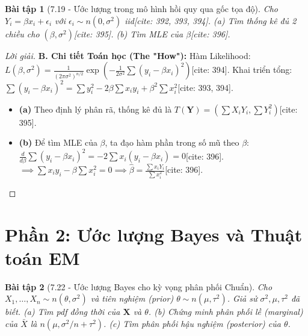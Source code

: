\documentclass[8pt,a4paper]{article}
\newtheorem{exercise}{Bài tập}
\newenvironment{solution}{\begin{proof}[Lời giải]}{\end{proof}}
\begin{document}
\begin{exercise}[7.19 - Ước lượng trong mô hình hồi quy qua gốc tọa độ]
Cho $Y_i = \beta x_i + \epsilon_i$ với $\epsilon_i \sim n(0, \sigma^2)$ iid[cite: 392, 393, 394].
(a) Tìm thống kê đủ 2 chiều cho $(\beta, \sigma^2)$[cite: 395].
(b) Tìm MLE của $\beta$[cite: 396].
\end{exercise}

\begin{solution}
\textbf{B. Chi tiết Toán học (The "How"):}
Hàm Likelihood: $L(\beta, \sigma^2) = \frac{1}{(2\pi\sigma^2)^{n/2}} \exp\left( -\frac{1}{2\sigma^2} \sum (y_i - \beta x_i)^2 \right)$[cite: 394].
Khai triển tổng: $\sum (y_i - \beta x_i)^2 = \sum y_i^2 - 2\beta \sum x_i y_i + \beta^2 \sum x_i^2$[cite: 393, 394].
\begin{itemize}
    \item \textbf{(a)} Theo định lý phân rã, thống kê đủ là $T(\mathbf{Y}) = \left( \sum X_i Y_i, \sum Y_i^2 \right)$[cite: 395].
    \item \textbf{(b)} Để tìm MLE của $\beta$, ta đạo hàm phần trong số mũ theo $\beta$:
    $\frac{d}{d\beta} \sum (y_i - \beta x_i)^2 = -2 \sum x_i(y_i - \beta x_i) = 0$[cite: 396].
    $\implies \sum x_i y_i - \beta \sum x_i^2 = 0 \implies \hat{\beta} = \frac{\sum x_i Y_i}{\sum x_i^2}$[cite: 396].
\end{itemize}
\end{solution}


\section*{Phần 2: Ước lượng Bayes và Thuật toán EM}

\begin{exercise}[7.22 - Ước lượng Bayes cho kỳ vọng phân phối Chuẩn]
Cho $X_1, \dots, X_n \sim n(\theta, \sigma^2)$ và tiên nghiệm (prior) $\theta \sim n(\mu, \tau^2)$. Giả sử $\sigma^2, \mu, \tau^2$ đã biết.
(a) Tìm pdf đồng thời của $\mathbf{X}$ và $\theta$.
(b) Chứng minh phân phối lề (marginal) của $\bar{X}$ là $n(\mu, \sigma^2/n + \tau^2)$.
(c) Tìm phân phối hậu nghiệm (posterior) của $\theta$.
\end{exercise}
\end{document}
